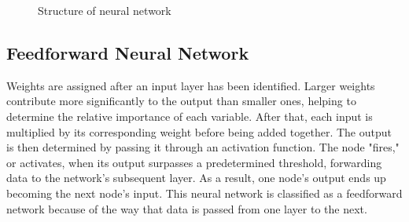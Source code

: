 \begin{figure}[htp]
	\centering
	
	\caption{Structure of neural network}
	\label{neural_n_example}
\end{figure}
 
 \subsection*{Feedforward Neural Network}
 Weights are assigned after an input layer has been identified. Larger weights contribute more significantly to the output than smaller ones, helping to determine the relative importance of each variable. After that, each input is multiplied by its corresponding weight before being added together. The output is then determined by passing it through an activation function. The node "fires," or activates, when its output surpasses a predetermined threshold, forwarding data to the network's subsequent layer. As a result, one node's output ends up becoming the next node's input. This neural network is classified as a feedforward network because of the way that data is passed from one layer to the next.
 

